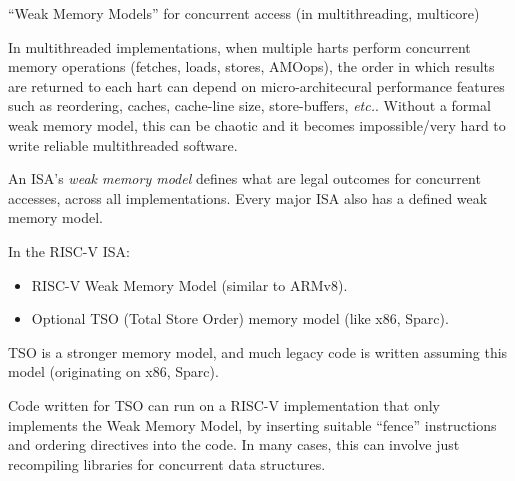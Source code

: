 \documentclass{article}
\newcommand{\etc}{\emph{etc.}}
\begin{document}
\begin{center}
  {\Huge
    ``Weak Memory Models'' for concurrent access (in multithreading, multicore)}

  \vspace*{0.5in}

  \begin{minipage}{10in}\Large

    In multithreaded implementations, when multiple harts perform
    concurrent memory operations (fetches, loads, stores, AMOops), the
    order in which results are returned to each hart can depend on
    micro-architecural performance features such as reordering,
    caches, cache-line size, store-buffers, {\etc}.  Without a formal
    weak memory model, this can be chaotic and it becomes
    impossible/very hard to write reliable multithreaded software.

    \vspace{0.3in}

    An ISA's \emph{weak memory model} defines what are legal outcomes
    for concurrent accesses, across all implementations.  Every major
    ISA also has a defined weak memory model.
      
    \vspace{0.3in}

    In the RISC-V ISA:

    \begin{itemize}
    \item RISC-V Weak Memory Model (similar to ARMv8).

    \item Optional TSO (Total Store Order) memory model (like x86, Sparc).
    \end{itemize}

    \vspace{0.3in}

    TSO is a stronger memory model, and much legacy code is written
    assuming this model (originating on x86, Sparc).

    \vspace{0.3in}

    Code written for TSO can run on a RISC-V implementation that only
    implements the Weak Memory Model, by inserting suitable ``fence''
    instructions and ordering directives into the code.  In many
    cases, this can involve just recompiling libraries for concurrent
    data structures.
  \end{minipage}
\end{center}
\end{document}
